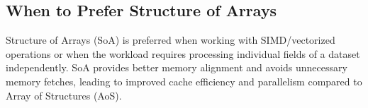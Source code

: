 \documentclass[../../main.tex]{subfiles}
\begin{document}
    \bigskip
    \subsection{When to Prefer Structure of Arrays}
    Structure of Arrays (SoA) is preferred when working with SIMD/vectorized operations or when the workload requires processing individual fields of a dataset independently. SoA provides better memory alignment and avoids unnecessary memory fetches, leading to improved cache efficiency and parallelism compared to Array of Structures (AoS).
            
\end{document}
